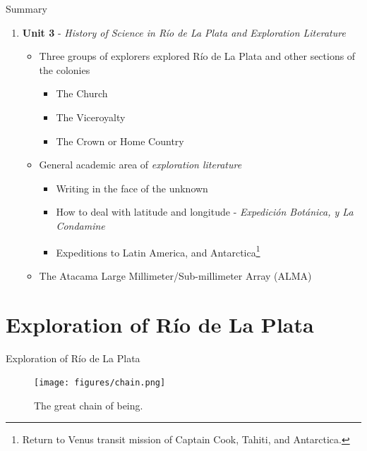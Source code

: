 \documentclass{beamer}
\begin{document}
\begin{frame}{Summary}
\begin{enumerate}
\item \textbf{Unit 3} - \textit{History of Science in R\'{i}o de La Plata and Exploration Literature}
\begin{itemize}
\item \alert{Three} groups of explorers explored R\'{i}o de La Plata and other sections of the colonies
\begin{itemize}
\item The Church
\item The Viceroyalty
\item The Crown or Home Country
\end{itemize}
\item General academic area of \textit{exploration literature}
\begin{itemize}
\item Writing in the face of the unknown
\item How to deal with latitude and longitude - \textit{Expedici\'{o}n Bot\'{a}nica, y La Condamine}
\item Expeditions to Latin America, and Antarctica\footnote{Return to Venus transit mission of Captain Cook, Tahiti, and Antarctica.}
\end{itemize}
\item The Atacama Large Millimeter/Sub-millimeter Array (ALMA)
\end{itemize}
\end{enumerate}
\end{frame}

\section{Exploration of R\'{i}o de La Plata}

\begin{frame}{Exploration of R\'{i}o de La Plata}
\begin{figure}
\centering
\texttt{[image: figures/chain.png]}
\caption{The great chain of being.}
\end{figure}
\end{frame}
\end{document}
